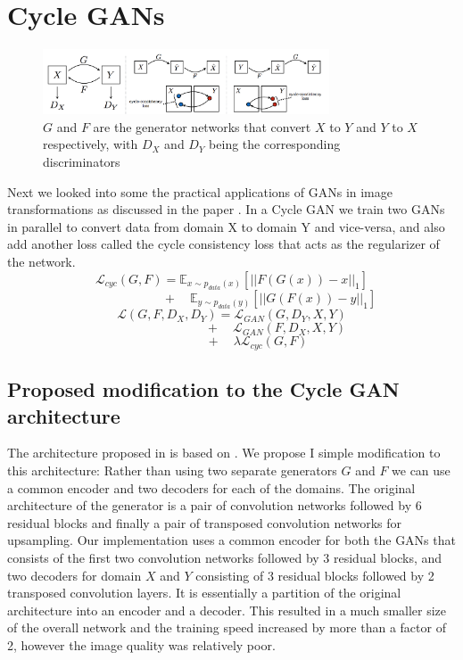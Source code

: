 \documentclass{article}
\begin{document}
\section{Cycle GANs}
\label{Cycle GAN}
\begin{figure}[h!]
        \includegraphics[width=8.5cm]{Cycle_GAN_idea.png}
        \caption{ $G$ and $F$ are the generator networks that convert $X$ to $Y$ and $Y$ to $X$ respectively, with $D_X$ and $D_Y$ being the corresponding discriminators}
        \label{fig:2}
\end{figure}
Next we looked into some the practical applications of GANs in image transformations as discussed in the paper \cite{cyclegan}.\newline
In a Cycle GAN we train two GANs in parallel to convert data from domain X to domain Y and vice-versa, and also add another loss called the cycle consistency loss that acts as the regularizer of the network.
\[\mathcal{L}_{cyc}(G,F)=\mathbb{E}_{x\sim p_{data}(x)}[||F(G(x)) - x||_1]\]
\[\quad\quad\quad\quad\quad\quad+\quad\mathbb{E}_{y\sim p_{data}(y)}[||G(F(x)) - y||_1]\]
\[\mathcal{L}(G,F,D_X,D_Y) = \mathcal{L}_{GAN}(G,D_Y,X,Y)\]
\[\quad\quad\quad\quad\quad\quad\quad+\quad\mathcal{L}_{GAN}(F,D_X,X,Y)\]
\[\quad\quad\quad\quad+\quad\lambda\mathcal{L}_{cyc}(G,F)\]

\subsection{Proposed modification to the Cycle GAN architecture}
\label{propsed modification to cycle GAN architecture}
The architecture proposed in \cite{cyclegan} is based on \cite{perceptual_loss}. We propose I simple modification to this architecture: \newline
Rather than using two separate generators $G$ and $F$ we can use a common encoder and two decoders for each of the domains. The original architecture of the generator is a pair of convolution networks followed by 6 residual blocks and finally a pair of transposed convolution networks for upsampling. Our implementation uses a common encoder for both the GANs that consists of the first two convolution networks followed by 3 residual blocks, and two decoders for domain $X$ and $Y$ consisting of 3 residual blocks followed by 2 transposed convolution layers. It is essentially a partition of the original architecture into an encoder and a decoder.\newline
This resulted in a much smaller size of the overall network and the training speed increased by more than a factor of 2, however the image quality was relatively poor.
\end{document}
